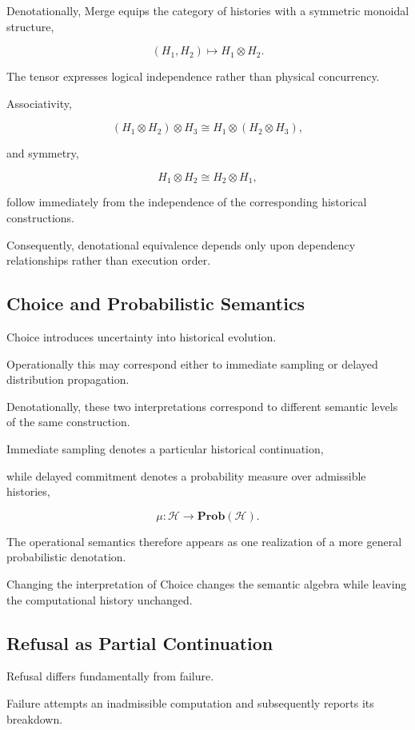 \documentclass[12pt,oneside]{article}
\theoremstyle{definition}
\theoremstyle{remark}
\begin{document}
Denotationally, Merge equips the category of histories with a symmetric
monoidal structure,

\[
(H_1,H_2)
\mapsto
H_1\otimes H_2.
\]

The tensor expresses logical independence rather than physical concurrency.

Associativity,

\[
(H_1\otimes H_2)\otimes H_3
\cong
H_1\otimes(H_2\otimes H_3),
\]

and symmetry,

\[
H_1\otimes H_2
\cong
H_2\otimes H_1,
\]

follow immediately from the independence of the corresponding historical
constructions.

Consequently, denotational equivalence depends only upon dependency
relationships rather than execution order.

\subsection{Choice and Probabilistic Semantics}

Choice introduces uncertainty into historical evolution.

Operationally this may correspond either to immediate sampling or delayed
distribution propagation.

Denotationally, these two interpretations correspond to different semantic
levels of the same construction.

Immediate sampling denotes a particular historical continuation,

while delayed commitment denotes a probability measure over admissible
histories,

\[
\mu
:
\mathcal H
\longrightarrow
\mathbf{Prob}(\mathcal H).
\]

The operational semantics therefore appears as one realization of a more
general probabilistic denotation.

Changing the interpretation of Choice changes the semantic algebra while
leaving the computational history unchanged.

\subsection{Refusal as Partial Continuation}

Refusal differs fundamentally from failure.

Failure attempts an inadmissible computation and subsequently reports its
breakdown.
\end{document}
